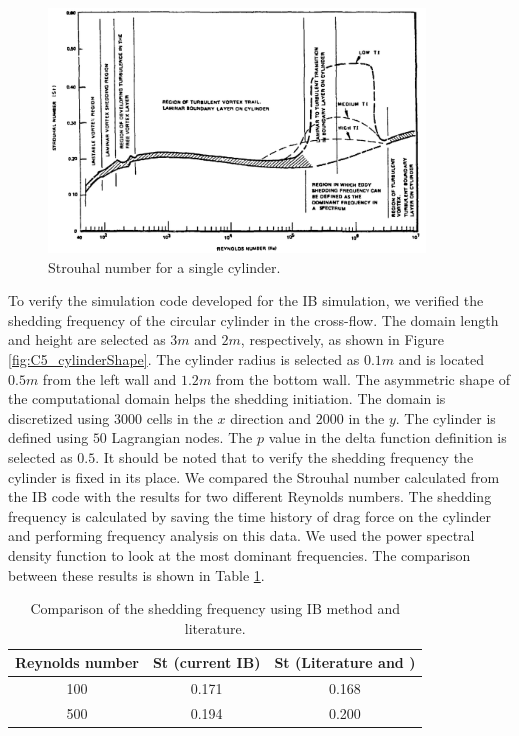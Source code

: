%
\begin{figure}[H]
    \centering
    \includegraphics[width=10.00cm]{Chapter_5/figure/StrouhalVsReynodsl.png}
    \caption{Strouhal number for a single cylinder.}
    \label{fig:C5_strouhalVSreynoldsNumber}
\end{figure}
%
To verify the simulation code developed for the IB simulation, we verified the shedding frequency of the circular cylinder in the cross-flow. The domain length and height are selected as $3 m$ and $2 m$, respectively, as shown in Figure \ref{fig:C5_cylinderShape}. The cylinder radius is selected as $0.1 m$ and is located $0.5 m$ from the left wall and $1.2 m$ from the bottom wall. The asymmetric shape of the computational domain helps the shedding initiation. The domain is discretized using $3000$ cells in the $x$ direction and $2000$ in the $y$. The cylinder is defined using $50$ Lagrangian nodes. The $p$ value in the delta function definition is selected as $0.5$. It should be noted that to verify the shedding frequency the cylinder is fixed in its place. We compared the Strouhal number calculated from the IB code with the results \cite{mittal2001control} for two different Reynolds numbers. The shedding frequency is calculated by saving the time history of drag force on the cylinder and performing frequency analysis on this data. We used the power spectral density function to look at the most dominant frequencies. The comparison between these results is shown in Table \ref{table:C5_strouhalVerification}.
%
\begin{table}[H]
\centering
\begin{tabular}{c | c | c}
     Reynolds number & St (current IB) & St (Literature \cite{jendrzejczyk1985fluid} and \cite{mittal2001control}) \\ \hline \hline
     100 & 0.171 & 0.168 \\ \hline
     500 & 0.194 & 0.200 \\
\end{tabular}
\caption{Comparison of the shedding frequency using IB method and literature.}
\label{table:C5_strouhalVerification}
\end{table}
